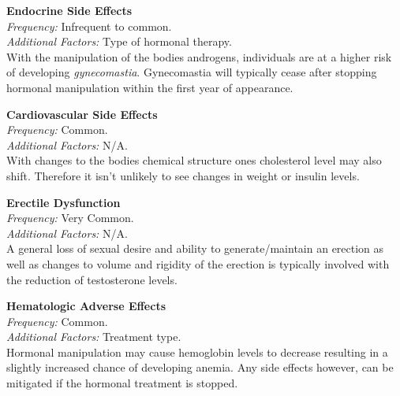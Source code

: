 \documentclass[journal]{vgtc}                %
\begin{document}
                        \textbf{Endocrine Side Effects}
                        \\ \textit{Frequency:} Infrequent to common.
                        \\ \textit{Additional Factors:} Type of hormonal therapy.
                        \\ With the manipulation of the bodies androgens, individuals are at a higher risk of developing \textit{gynecomastia}.
                        Gynecomastia will typically cease after stopping hormonal manipulation within the first year of appearance.
                        \newline

                        \textbf{Cardiovascular Side Effects}
                        \\ \textit{Frequency:} Common.
                        \\ \textit{Additional Factors:} N/A.
                        \\ With changes to the bodies chemical structure ones cholesterol level may also shift.
                        Therefore it isn't unlikely to see changes in weight or insulin levels. \cite{AdverseEvents:2005}
                        \newline

                        \textbf{Erectile Dysfunction}
                        \\ \textit{Frequency:} Very Common.
                        \\ \textit{Additional Factors:} N/A.
                        \\ A general loss of sexual desire and ability to generate/maintain an erection as well as changes to volume and rigidity of the erection is typically involved with the reduction of testosterone levels.
                        \newline

                        \textbf{Hematologic Adverse Effects}
                        \\ \textit{Frequency:} Common.
                        \\ \textit{Additional Factors:} Treatment type.
                        \\ Hormonal manipulation may cause hemoglobin levels to decrease resulting in a slightly increased chance of developing anemia. Any side effects however, can be mitigated if the hormonal treatment is stopped. \cite{AdverseEvents:2005}
                        \newline
\end{document}
